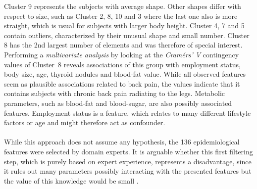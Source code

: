 \documentclass[journal]{style/vgtc} 			          %
\begin{document}
Cluster 9 represents the subjects with average shape.
%
Other shapes differ with respect to size, such as Cluster 2, 8, 10 and 3 where the last one also is more straight, which is usual for subjects with larger body height.
%
Cluster 4, 7 and 5 contain outliers, characterized by their unusual shape and small number.
%
Cluster 8 has the 2nd largest number of elements and was therefore of special interest.
%
Performing a \emph{multivariate analysis} by looking at the \emph{Cram\'{e}rs' V} contingency values of Cluster~8 reveals associations of this group with employment status, body size, age, thyroid nodules and blood-fat value.
%
While all observed features seem as plausible associations related to back pain, the values indicate that it contains subjects with chronic back pain radiating to the legs.
%
Metabolic parameters, such as blood-fat and blood-sugar, are also possibly associated features.
%
Employment status is a feature, which relates to many different lifestyle factors or age and might therefore act as confounder.
\\\\
While this approach does not assume any hypothesis, the 136 epidemiological features were selected by domain experts. %
%
It is arguable whether this first filtering step, which is purely based on expert experience, represents a disadvantage, since it rules out many parameters possibly interacting with the presented features but the value of this knowledge would be small \cite{Wiley2008}.
\end{document}
